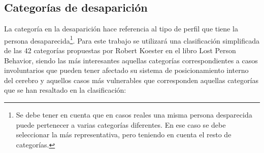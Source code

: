 \subsection{Categorías de desaparición}
La categoría en la desaparición hace referencia al tipo de perfil que tiene la persona desaparecida\footnote{Se debe tener en cuenta que en casos reales una misma persona desparecida puede pertenecer a varias categorías diferentes. En ese caso se debe seleccionar la más representativa, pero teniendo en cuenta el resto de categorías.}. Para este trabajo se utilizará una clasificación simplificada de las 42 categorías propuestas por Robert Koester en el libro Lost Person Behavior\cite{libroLostPersonBehavior}, siendo las más interesantes aquellas categorías correspondientes a casos involuntarios que pueden tener afectado su sistema de posicionamiento interno del cerebro y aquellos casos más vulnerables que corresponden aquellas categorías que se han resaltado en la clasificación:
